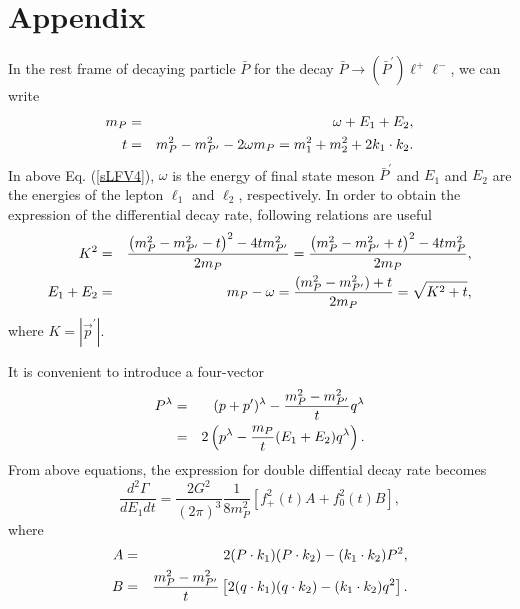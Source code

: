 \documentclass{ws-ijmpa}
\begin{document}
\section*{Appendix}

In the rest frame of decaying particle $\bar{P}$ for the decay $\bar{P}\to (\bar{P}^{\prime})\ell^{+}\ell^{-}$, we can write
\begin{eqnarray}
m_{P} & = &\omega + E_{1} + E_{2}\notag ,\\
t &=& m^2_{P}-m^2_{P^{\prime}}-2\omega m_{P} = m^2_{1}+ m^2_{2}+2k_{1}\cdot k_2 \label{sLFV4}.
\end{eqnarray}
In above Eq. (\ref{sLFV4}), $\omega$ is the energy of final state meson $\bar{P}^{\prime}$ and $E_{1}$ and $E_{2}$ are the energies of the lepton $\ell_1$ and $\ell_2$, respectively. In order to obtain the expression of the differential decay rate, following relations are useful
\begin{eqnarray}
K^{2}&=&\frac{\left(m^2_{P}-m^2_{P^{\prime}}-t\right)^2-4tm^2_{P^{\prime}}}{2m_{P}} = \frac{\left(m^2_{P}-m^2_{P^{\prime}}+t\right)^2-4tm^2_{P}}{2m_{P}}\notag,\\
E_{1}+E_{2} & = & m_{P}-\omega =\frac{(m^2_{P}-m^2_{P^{\prime}})+t}{2m_{P}} = \sqrt{K^2+t},\label{sLFV5}
\end{eqnarray}
where $K = |\vec{p}^{\prime}|$. 

It is convenient to introduce a four-vector
\begin{eqnarray}
P^{\lambda}& = &(p+p^{\prime})^{\lambda}-\frac{m^2_{P}-m^2_{P^{\prime}}}{t}q^{\lambda}\notag\\
& = &2\left(p^{\lambda}-\frac{m_{P}}{t}(E_{1}+E_{2})q^{\lambda}\right)\label{sLFV6}.
\end{eqnarray}
From above equations, the expression for double diffential decay rate becomes
\begin{equation}
\frac{d^2\Gamma}{dE_{1}dt} = \frac{2G^2}{(2\pi)^3}\frac{1}{8m^2_{P}}\left[f^2_{+}(t)A + f^2_{0}(t)B\right]\label{sLFV7},
\end{equation}
where
\begin{eqnarray}
A &=& 2(P\cdot k_{1})(P\cdot k_2) - (k_{1}\cdot k_2)P^2\notag ,\\
B  &=& \frac{m^2_{P}-m^2_{P^{\prime}}}{t}\left[2(q\cdot k_{1})(q\cdot k_2) - (k_{1}\cdot k_2)q^2\right]\label{sLFV8}.
\end{eqnarray}
\end{document}
